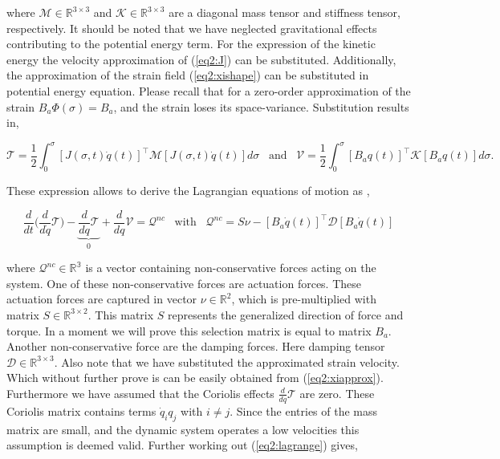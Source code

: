 where $\mathcal{M} \in \mathbb{R}^{3\times3}$ and $\mathcal{K} \in \mathbb{R}^{3\times3}$ are a diagonal mass tensor and stiffness tensor, respectively. It should be noted that we have neglected gravitational effects contributing to the potential energy term. For the expression of the kinetic energy the velocity approximation of (\ref{eq2:J}) can be substituted. Additionally, the approximation of the strain field (\ref{eq2:xishape}) can be substituted in potential energy equation. Please recall that for a zero-order approximation of the strain $B_a \Phi(\sigma)= B_a$, and the strain loses its space-variance. Substitution results in,

\begin{equation}
    \mathcal{T} = \frac{1}{2}\int_0^{\sigma} [J(\sigma,t)\dot{q}(t)]^\top \mathcal{M} [J(\sigma,t)\dot{q}(t)] d \sigma  \hspace{10pt} \text{and} \hspace{10pt}  \mathcal{V} = \frac{1}{2}\int_0^{\sigma} [B_aq(t)]^\top \mathcal{K} [B_a q(t)] d \sigma.
\end{equation}

These expression allows to derive the Lagrangian equations of motion as \cite{NWouw},

\begin{equation}
    \frac{d}{dt}\Big( \frac{d}{d\dot{q}}\mathcal{T}\Big)- \underbrace{\frac{d}{dq}\mathcal{T}}_0 + \frac{d}{dq}\mathcal{V} = \mathcal{Q}^{nc} \hspace{10pt} \text{with} \hspace{10pt} \mathcal{Q}^{nc} =  S\nu - [B_a\dot{q}(t)]^\top \mathcal{D} [B_a\dot{q}(t)]
    \label{eq2:lagrange}
\end{equation}

where $\mathcal{Q}^{nc} \in \mathbb{R^3}$ is a vector containing non-conservative forces acting on the system. One of these non-conservative forces are actuation forces. These actuation forces are captured in vector $\nu \in \mathbb{R}^2$, which is pre-multiplied with matrix $S \in \mathbb{R}^{3\times 2}$. This matrix $S$ represents the generalized direction of force and torque. In a moment we will prove this selection matrix is equal to matrix $B_a$. Another non-conservative force are the damping forces. Here damping tensor $\mathcal{D} \in \mathbb{R}^{3 \times 3}$. Also note that we have substituted the approximated strain velocity. Which without further prove is can be easily obtained from (\ref{eq2:xiapprox}). Furthermore we have assumed that the Coriolis effects $\frac{d}{dq}\mathcal{T}$ are zero. These Coriolis matrix contains terms $\dot{q}_i q_j$ with $i \neq j$. Since the entries of the mass matrix are small, and the dynamic system operates a low velocities this assumption is deemed valid. Further working out (\ref{eq2:lagrange}) gives,


